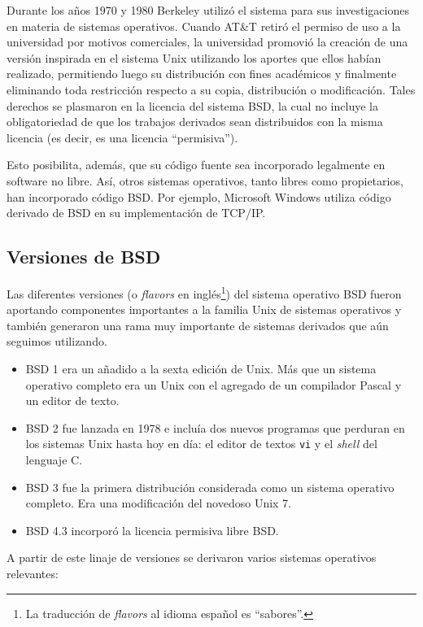 Durante los años 1970 y 1980 Berkeley utilizó el sistema para sus investigaciones en materia de sistemas operativos. Cuando AT\&T retiró el permiso de uso a la universidad por motivos comerciales, la universidad promovió la creación de una versión inspirada en el sistema Unix utilizando los aportes que ellos habían realizado, permitiendo luego su distribución con fines académicos y finalmente eliminando toda restricción respecto a su copia, distribución o modificación. Tales derechos se plasmaron en la licencia del sistema BSD, la cual no incluye la obligatoriedad de que los trabajos derivados sean distribuidos con la misma licencia (es decir, es una licencia ``permisiva'').

Esto posibilita, además, que su código fuente sea incorporado legalmente en software no libre. Así, otros sistemas operativos, tanto libres como propietarios, han incorporado código BSD. Por ejemplo, Microsoft Windows utiliza código derivado de BSD en su implementación de TCP/IP.
 
\subsection{Versiones de BSD}

Las diferentes versiones (o \emph{flavors} en inglés\footnote{La traducción de \emph{flavors} al idioma español es ``sabores''.}) del sistema operativo BSD fueron aportando componentes importantes a la familia Unix de sistemas operativos y también generaron una rama muy importante de sistemas derivados que aún seguimos utilizando. 

\begin{itemize}
	\item BSD 1 era un añadido a la sexta edición de Unix. Más que un sistema operativo completo era un Unix con el agregado de un compilador Pascal y un editor de texto.
	\item BSD 2 fue lanzada en 1978 e incluía dos nuevos programas que perduran en los sistemas Unix hasta hoy en día: el editor de textos \texttt{vi} y el \emph{shell} del lenguaje C.
	\item BSD 3 fue la primera distribución considerada como un sistema operativo completo. Era una modificación del novedoso Unix 7.
	\item BSD 4.3 incorporó la licencia permisiva libre BSD.
\end{itemize}

A partir de este linaje de versiones se derivaron varios sistemas operativos relevantes:

